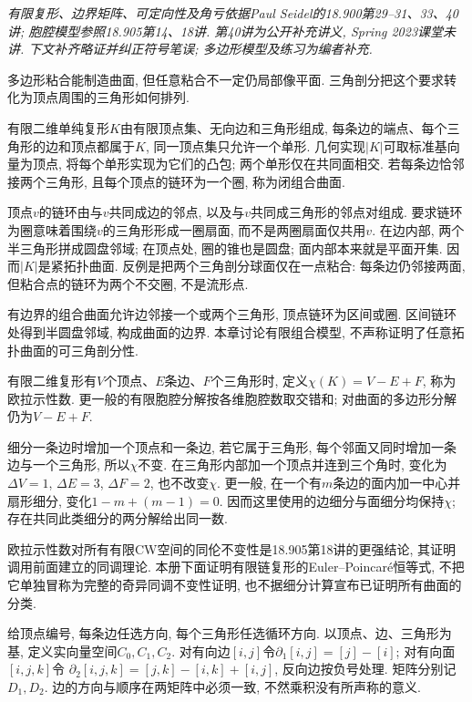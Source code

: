 \label{ch:surfaces}
\emph{有限复形、边界矩阵、可定向性及角亏依据Paul Seidel的18.900第29--31、33、40讲; 胞腔模型参照18.905第14、18讲. 第40讲为公开补充讲义, Spring 2023课堂未讲. 下文补齐略证并纠正符号笔误; 多边形模型及练习为编者补充.}

多边形粘合能制造曲面, 但任意粘合不一定仍局部像平面. 三角剖分把这个要求转化为顶点周围的三角形如何排列.
\begin{definition}
有限二维单纯复形$K$由有限顶点集、无向边和三角形组成, 每条边的端点、每个三角形的边和顶点都属于$K$, 同一顶点集只允许一个单形. 几何实现$|K|$可取标准基向量为顶点, 将每个单形实现为它们的凸包; 两个单形仅在共同面相交. 若每条边恰邻接两个三角形, 且每个顶点的链环为一个圈, 称为闭组合曲面.
\end{definition}
顶点$v$的链环由与$v$共同成边的邻点, 以及与$v$共同成三角形的邻点对组成. 要求链环为圈意味着围绕$v$的三角形形成一圈扇面, 而不是两圈扇面仅共用$v$. 在边内部, 两个半三角形拼成圆盘邻域; 在顶点处, 圈的锥也是圆盘; 面内部本来就是平面开集. 因而$|K|$是紧拓扑曲面. 反例是把两个三角剖分球面仅在一点粘合: 每条边仍邻接两面, 但粘合点的链环为两个不交圈, 不是流形点.

有边界的组合曲面允许边邻接一个或两个三角形, 顶点链环为区间或圈. 区间链环处得到半圆盘邻域, 构成曲面的边界. 本章讨论有限组合模型, 不声称证明了任意拓扑曲面的可三角剖分性.

\begin{definition}
有限二维复形有$V$个顶点、$E$条边、$F$个三角形时, 定义$\chi(K)=V-E+F$, 称为欧拉示性数. 更一般的有限胞腔分解按各维胞腔数取交错和; 对曲面的多边形分解仍为$V-E+F$.
\end{definition}
细分一条边时增加一个顶点和一条边, 若它属于三角形, 每个邻面又同时增加一条边与一个三角形, 所以$\chi$不变. 在三角形内部加一个顶点并连到三个角时, 变化为$\Delta V=1$, $\Delta E=3$, $\Delta F=2$, 也不改变$\chi$. 更一般, 在一个有$m$条边的面内加一中心并扇形细分, 变化$1-m+(m-1)=0$. 因而这里使用的边细分与面细分均保持$\chi$; 存在共同此类细分的两分解给出同一数.

欧拉示性数对所有有限CW空间的同伦不变性是18.905第18讲的更强结论, 其证明调用前面建立的同调理论. 本册下面证明有限链复形的Euler--Poincar\'e恒等式, 不把它单独冒称为完整的奇异同调不变性证明, 也不据细分计算宣布已证明所有曲面的分类.

给顶点编号, 每条边任选方向, 每个三角形任选循环方向. 以顶点、边、三角形为基, 定义实向量空间$C_0,C_1,C_2$. 对有向边$[i,j]$令$\partial_1[i,j]=[j]-[i]$; 对有向面$[i,j,k]$令
$\partial_2[i,j,k]=[j,k]-[i,k]+[i,j]$,
反向边按负号处理. 矩阵分别记$D_1,D_2$. 边的方向与顺序在两矩阵中必须一致, 不然乘积没有所声称的意义.

